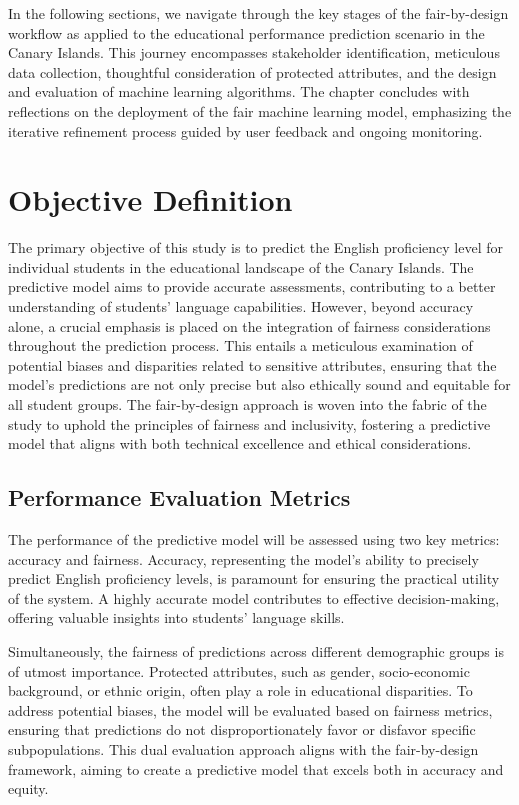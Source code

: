 In the following sections, we navigate through the key stages of the fair-by-design workflow as applied to the educational performance prediction scenario in the Canary Islands. This journey encompasses stakeholder identification, meticulous data collection, thoughtful consideration of protected attributes, and the design and evaluation of machine learning algorithms. The chapter concludes with reflections on the deployment of the fair machine learning model, emphasizing the iterative refinement process guided by user feedback and ongoing monitoring.

\section{Objective Definition}

The primary objective of this study is to predict the English proficiency level for individual students in the educational landscape of the Canary Islands. The predictive model aims to provide accurate assessments, contributing to a better understanding of students' language capabilities. However, beyond accuracy alone, a crucial emphasis is placed on the integration of fairness considerations throughout the prediction process. This entails a meticulous examination of potential biases and disparities related to sensitive attributes, ensuring that the model's predictions are not only precise but also ethically sound and equitable for all student groups. The fair-by-design approach is woven into the fabric of the study to uphold the principles of fairness and inclusivity, fostering a predictive model that aligns with both technical excellence and ethical considerations.

\subsection{Performance Evaluation Metrics}

The performance of the predictive model will be assessed using two key metrics: accuracy and fairness. Accuracy, representing the model's ability to precisely predict English proficiency levels, is paramount for ensuring the practical utility of the system. A highly accurate model contributes to effective decision-making, offering valuable insights into students' language skills.

Simultaneously, the fairness of predictions across different demographic groups is of utmost importance. Protected attributes, such as gender, socio-economic background, or ethnic origin, often play a role in educational disparities. To address potential biases, the model will be evaluated based on fairness metrics, ensuring that predictions do not disproportionately favor or disfavor specific subpopulations. This dual evaluation approach aligns with the fair-by-design framework, aiming to create a predictive model that excels both in accuracy and equity.

